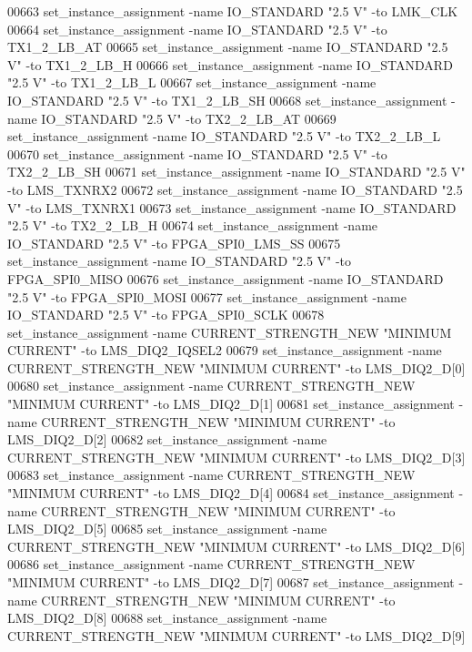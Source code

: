 \begin{DoxyCode}
00663 set\_instance\_assignment -name IO\_STANDARD "2.\textcolor{vhdllogic}{5} V" -to LMK\_CLK
00664 set\_instance\_assignment -name IO\_STANDARD "2.\textcolor{vhdllogic}{5} V" -to TX1\_2\_LB\_AT
00665 set\_instance\_assignment -name IO\_STANDARD "2.\textcolor{vhdllogic}{5} V" -to TX1\_2\_LB\_H
00666 set\_instance\_assignment -name IO\_STANDARD "2.\textcolor{vhdllogic}{5} V" -to TX1\_2\_LB\_L
00667 set\_instance\_assignment -name IO\_STANDARD "2.\textcolor{vhdllogic}{5} V" -to TX1\_2\_LB\_SH
00668 set\_instance\_assignment -name IO\_STANDARD "2.\textcolor{vhdllogic}{5} V" -to TX2\_2\_LB\_AT
00669 set\_instance\_assignment -name IO\_STANDARD "2.\textcolor{vhdllogic}{5} V" -to TX2\_2\_LB\_L
00670 set\_instance\_assignment -name IO\_STANDARD "2.\textcolor{vhdllogic}{5} V" -to TX2\_2\_LB\_SH
00671 set\_instance\_assignment -name IO\_STANDARD "2.\textcolor{vhdllogic}{5} V" -to LMS\_TXNRX2
00672 set\_instance\_assignment -name IO\_STANDARD "2.\textcolor{vhdllogic}{5} V" -to LMS\_TXNRX1
00673 set\_instance\_assignment -name IO\_STANDARD "2.\textcolor{vhdllogic}{5} V" -to TX2\_2\_LB\_H
00674 set\_instance\_assignment -name IO\_STANDARD "2.\textcolor{vhdllogic}{5} V" -to FPGA\_SPI0\_LMS\_SS
00675 set\_instance\_assignment -name IO\_STANDARD "2.\textcolor{vhdllogic}{5} V" -to FPGA\_SPI0\_MISO
00676 set\_instance\_assignment -name IO\_STANDARD "2.\textcolor{vhdllogic}{5} V" -to FPGA\_SPI0\_MOSI
00677 set\_instance\_assignment -name IO\_STANDARD "2.\textcolor{vhdllogic}{5} V" -to FPGA\_SPI0\_SCLK
00678 set\_instance\_assignment -name CURRENT\_STRENGTH\_NEW "MINIMUM CURRENT" -to LMS\_DIQ2\_IQSEL2
00679 set\_instance\_assignment -name CURRENT\_STRENGTH\_NEW "MINIMUM CURRENT" -to LMS\_DIQ2\_D[0]
00680 set\_instance\_assignment -name CURRENT\_STRENGTH\_NEW "MINIMUM CURRENT" -to LMS\_DIQ2\_D[1]
00681 set\_instance\_assignment -name CURRENT\_STRENGTH\_NEW "MINIMUM CURRENT" -to LMS\_DIQ2\_D[2]
00682 set\_instance\_assignment -name CURRENT\_STRENGTH\_NEW "MINIMUM CURRENT" -to LMS\_DIQ2\_D[3]
00683 set\_instance\_assignment -name CURRENT\_STRENGTH\_NEW "MINIMUM CURRENT" -to LMS\_DIQ2\_D[4]
00684 set\_instance\_assignment -name CURRENT\_STRENGTH\_NEW "MINIMUM CURRENT" -to LMS\_DIQ2\_D[5]
00685 set\_instance\_assignment -name CURRENT\_STRENGTH\_NEW "MINIMUM CURRENT" -to LMS\_DIQ2\_D[6]
00686 set\_instance\_assignment -name CURRENT\_STRENGTH\_NEW "MINIMUM CURRENT" -to LMS\_DIQ2\_D[7]
00687 set\_instance\_assignment -name CURRENT\_STRENGTH\_NEW "MINIMUM CURRENT" -to LMS\_DIQ2\_D[8]
00688 set\_instance\_assignment -name CURRENT\_STRENGTH\_NEW "MINIMUM CURRENT" -to LMS\_DIQ2\_D[9]

\end{DoxyCode}
